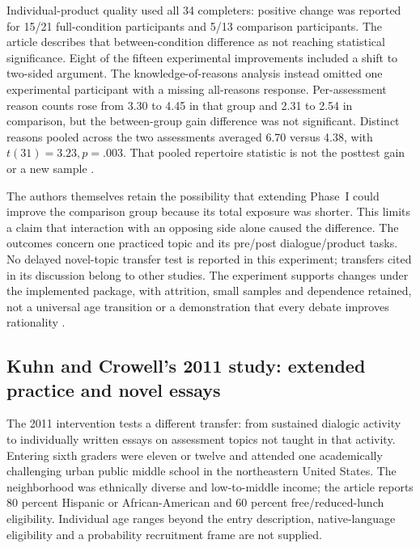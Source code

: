 Individual-product quality used all 34 completers: positive change was
reported for 15/21 full-condition participants and 5/13 comparison
participants. The article describes that between-condition difference as
not reaching statistical significance. Eight of the fifteen experimental
improvements included a shift to two-sided argument. The knowledge-of-reasons
analysis instead omitted one experimental participant with a missing
all-reasons response. Per-assessment reason counts rose from 3.30 to 4.45
in that group and 2.31 to 2.54 in comparison, but the between-group gain
difference was not significant. Distinct reasons pooled across the two
assessments averaged 6.70 versus 4.38, with \(t(31)=3.23,p=.003\).
That pooled repertoire statistic is not the posttest gain or a new sample
\cite[pp.~1254--1255, table~7]{KuhnUdell2003Development}.

The authors themselves retain the possibility that extending Phase~I
could improve the comparison group because its total exposure was shorter.
This limits a claim that interaction with an opposing side alone caused
the difference. The outcomes concern one practiced topic and its pre/post
dialogue/product tasks. No delayed novel-topic transfer test is reported
in this experiment; transfers cited in its discussion belong to other
studies. The experiment supports changes under the implemented package,
with attrition, small samples and dependence retained, not a universal
age transition or a demonstration that every debate improves rationality
\cite[pp.~1256--1258]{KuhnUdell2003Development}.

\subsection{Kuhn and Crowell's 2011 study: extended practice and novel essays}
\label{sec:p19-r151-kuhn-crowell}

The 2011 intervention tests a different transfer: from sustained dialogic
activity to individually written essays on assessment topics not taught in
that activity. Entering sixth graders were eleven or twelve and attended
one academically challenging urban public middle school in the northeastern
United States. The neighborhood was ethnically diverse and low-to-middle
income; the article reports 80 percent Hispanic or African-American and
60 percent free/reduced-lunch eligibility. Individual age ranges beyond
the entry description, native-language eligibility and a probability
recruitment frame are not supplied.

